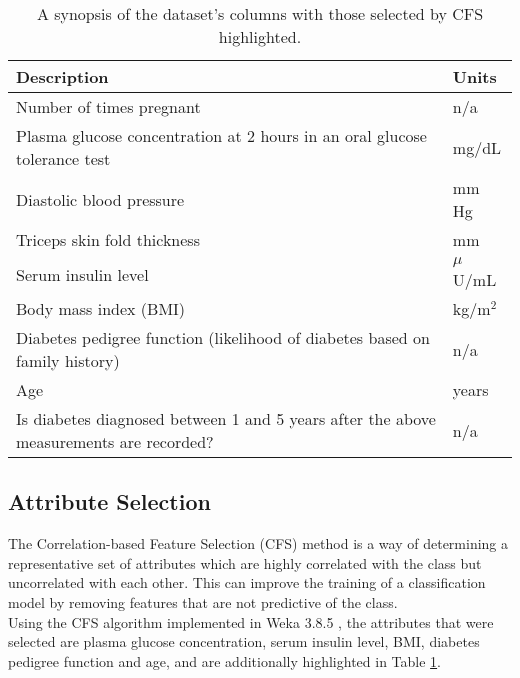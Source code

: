 \begin{table}[h!]
    \caption{A synopsis of the dataset's columns with those selected by CFS highlighted.\label{tab:cols}}
    \begin{center}
        \begin{tabular}{|m{14cm}|l|}
        \hline
        \textbf{Description} & \textbf{Units} \\
        \hline
        Number of times pregnant & n/a\nomenclature{n/a}{Not applicable} \\
        \rowcolor{yellow}Plasma glucose concentration at 2 hours in an oral glucose tolerance test & mg/dL\nomenclature{mg/dL}{Milligrams per decilitre} \\
        Diastolic blood pressure & mm Hg\nomenclature{mm Hg}{Millimetres of mercury} \\
        Triceps skin fold thickness & mm\nomenclature{mm}{Millimetres} \\
        \rowcolor{yellow}Serum insulin level & $\mu$U/mL\nomenclature{$\mu$U/mL}{Micro enzyme units per millilitre} \\
        \rowcolor{yellow}Body mass index (BMI) & kg/m$^2$\nomenclature{kg/m$^2$}{Weight in kilograms per height in metres squared} \\
        \rowcolor{yellow}Diabetes pedigree function (likelihood of diabetes based on family history) & n/a \\
        \rowcolor{yellow}Age & years \\
        Is diabetes diagnosed between 1 and 5 years after the above measurements are recorded? & n/a\\
        \hline
    \end{tabular}
    \end{center}

    \subsection{Attribute Selection}
    The Correlation-based Feature Selection (CFS) method is a way of determining a representative set of attributes which are highly correlated with the class but uncorrelated with each other. This can improve the training of a classification model by removing features that are not predictive of the class. \\

    Using the CFS algorithm implemented in Weka 3.8.5 \cite{weka}, the attributes that were selected are plasma glucose concentration, serum insulin level, BMI, diabetes pedigree function and age, and are additionally highlighted in Table \ref{tab:cols}.
\end{table}
